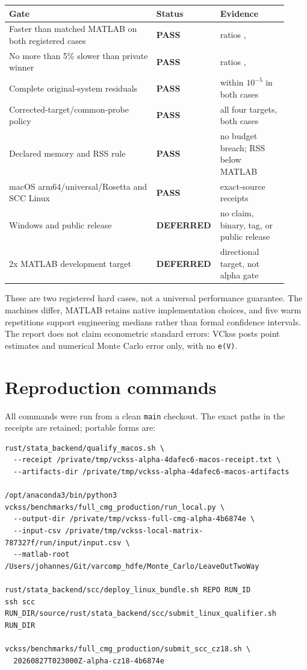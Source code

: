 \documentclass[10pt]{article}
\newcommand{\code}[1]{\texttt{#1}}
\newcommand{\pass}{\textcolor{vgreen}{\textbf{PASS}}}
\newcommand{\deferred}{\textcolor{vgold}{\textbf{DEFERRED}}}
\begin{document}
\begin{tabular}{>{\raggedright\arraybackslash}p{0.52\linewidth}p{0.16\linewidth}p{0.24\linewidth}}
\toprule
Gate & Status & Evidence \\
\midrule
Faster than matched MATLAB on both registered cases & \pass & ratios \MacRatio{}, \SccRatio{} \\
No more than 5\% slower than private winner & \pass & ratios \MacPrivateRatio{}, \SccPrivateRatio{} \\
Complete original-system residuals & \pass & within $10^{-5}$ in both cases \\
Corrected-target/common-probe policy & \pass & all four targets, both cases \\
Declared memory and RSS rule & \pass & no budget breach; RSS below MATLAB \\
macOS arm64/universal/Rosetta and SCC Linux & \pass & exact-source receipts \\
Windows and public release & \deferred & no claim, binary, tag, or public release \\
2x MATLAB development target & \deferred & directional target, not alpha gate \\
\bottomrule
\end{tabular}
\par\medskip

These are two registered hard cases, not a universal performance guarantee.
The machines differ, MATLAB retains native implementation choices, and five
warm repetitions support engineering medians rather than formal confidence
intervals. The report does not claim econometric standard errors: VCkss posts
point estimates and numerical Monte Carlo error only, with no \code{e(V)}.

\section{Reproduction commands}

All commands were run from a clean \code{main} checkout. The exact paths in
the receipts are retained; portable forms are:

\begin{verbatim}
rust/stata_backend/qualify_macos.sh \
  --receipt /private/tmp/vckss-alpha-4dafec6-macos-receipt.txt \
  --artifacts-dir /private/tmp/vckss-alpha-4dafec6-macos-artifacts

/opt/anaconda3/bin/python3 vckss/benchmarks/full_cmg_production/run_local.py \
  --output-dir /private/tmp/vckss-full-cmg-alpha-4b6874e \
  --input-csv /private/tmp/vckss-local-matrix-787327f/run/input/input.csv \
  --matlab-root /Users/johannes/Git/varcomp_hdfe/Monte_Carlo/LeaveOutTwoWay

rust/stata_backend/scc/deploy_linux_bundle.sh REPO RUN_ID
ssh scc RUN_DIR/source/rust/stata_backend/scc/submit_linux_qualifier.sh RUN_DIR

vckss/benchmarks/full_cmg_production/submit_scc_cz18.sh \
  20260827T023000Z-alpha-cz18-4b6874e
\end{verbatim}
\end{document}
